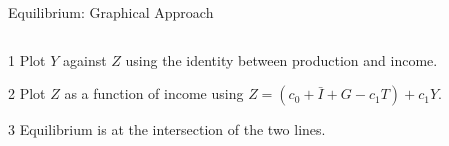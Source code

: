 \documentclass[shownotes,11pt, aspectratio=169]{beamer}
\newenvironment{wideitemize}{\itemize\addtolength{\itemsep}{10pt}}{\enditemize}
\begin{document}
\begin{frame}{Equilibrium: Graphical Approach}
\begin{columns}[T] %
\begin{column}{.52\textwidth}
  \begin{wideitemize}
    \item[1] Plot $Y$ against $Z$ using the identity between production and income.
    \item[2] Plot $Z$ as a function of income using $Z = (c_0 + \bar{I} + G - c_1T) + c_1Y$.
    \item[3] Equilibrium is at the intersection of the two lines. 
  \end{wideitemize}
\end{column}%
\pause
\hfill%
\begin{column}{.44\textwidth}
\end{column}%
\end{columns}
\end{frame}
\end{document}
